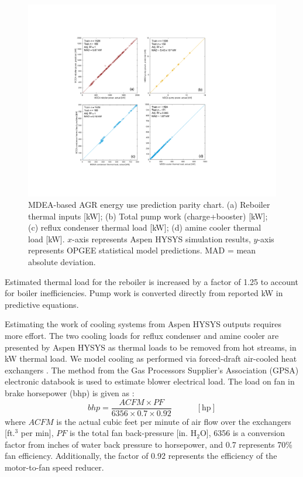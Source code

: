 \documentclass[11pt]{report}
\newcommand{\eqnunit}[1]{\quad\quad \scriptstyle{\left[\text{#1}\right]}}
\begin{document}
\begin{figure}
\includegraphics[width=1\columnwidth]{images/MDEA_comb.pdf}
\caption{MDEA-based AGR energy use prediction parity chart. (a) Reboiler thermal inputs [kW]; (b) Total pump work (charge+booster) [kW]; (c) reflux condenser thermal load [kW]; (d) amine cooler thermal load [kW]. $x$-axis represents Aspen HYSYS simulation results, $y$-axis represents OPGEE statistical model predictions. MAD = mean absolute deviation.}
\label{fig:AGR_resid_MDEA}
\end{figure}

\clearpage

Estimated thermal load for the reboiler is increased by a factor of 1.25 to account for boiler inefficiencies. Pump work is converted directly from reported kW in predictive equations. 

Estimating the work of cooling systems from Aspen HYSYS outputs requires more effort. The two cooling loads for reflux condenser and amine cooler are presented by Aspen HYSYS as thermal loads to be removed from hot streams, in kW thermal load.  We model cooling as performed via forced-draft air-cooled heat exchangers \cite{Manning1991, GPSA2004}.  The method from the Gas Processors Supplier's Association (GPSA) electronic databook is used to estimate blower electrical load. The load on fan in brake horsepower (bhp) is given as \cite[p. 10-17]{GPSA2004}:
\begin{equation}
bhp = \frac{ACFM \times PF}{6356 \times 0.7 \times 0.92} \quad \eqnunit{hp}
\end{equation}
where $ACFM$ is the actual cubic feet per minute of air flow over the exchangers [ft.$^3$ per min], $PF$ is the total fan back-pressure [in. H$_2$O], 6356 is a conversion factor from inches of water back pressure to horsepower, and 0.7 represents 70\% fan efficiency.  Additionally, the factor of 0.92 represents the efficiency of the motor-to-fan speed reducer.
\end{document}

